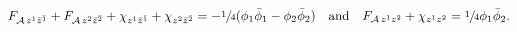 \begin{equation}\label{eq:blabla}
  F_{\mathcal{A}\,z^1\bar{z}^{\bar{1}}}+
  F_{\mathcal{A}\,z^2\bar{z}^{\bar{2}}}+\chi_{z^1\bar{z}^{\bar{1}}}+
  \chi_{z^2\bar{z}^{\bar{2}}}=-\sfrac{1}{4}
  (\phi_1\bar{\phi}_1-\phi_2\bar{\phi}_2)
  \quad \text{and}\quad F_{\mathcal{A}\,z^1z^2}+
  \chi_{z^1z^2}=\sfrac{1}{4}\phi_1\bar{\phi}_2.
\end{equation}

